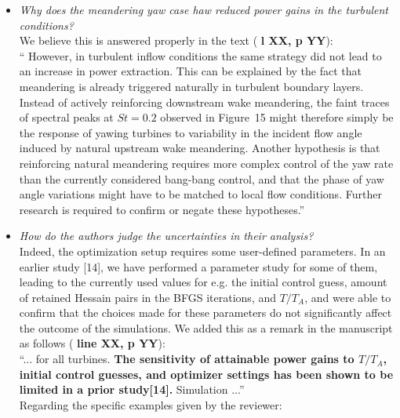\documentclass[]{article}
\newcommand{\red}[1]{\textbf{\color{red} #1}}
\newcommand{\revision}[1]{\textbf{#1}}
\begin{document}
\begin{itemize}
	\item \textit{Why does the meandering yaw case haw reduced power gains in the turbulent conditions?} \\ We believe this is answered properly in the text (\red{l XX, p YY}):\\ `` However, in turbulent inflow conditions the same strategy did not lead to an increase in power extraction. This can be explained by the fact that meandering is already triggered naturally in turbulent boundary layers. Instead of actively reinforcing downstream wake meandering, the faint traces of spectral peaks at $St = 0.2$ observed in Figure~15 might therefore simply be the response of yawing turbines to variability in the incident flow angle induced by natural upstream wake meandering. Another hypothesis is that reinforcing natural meandering requires more complex control of the yaw rate than the currently considered bang-bang control, and that the phase of yaw angle variations might have to be matched to local flow conditions. Further research is required to confirm or negate these hypotheses.''
	\item \textit{How do the authors judge the uncertainties in their analysis?} \\ Indeed, the optimization setup requires some user-defined parameters. In an earlier study [14], we have performed a parameter study for some of them, leading to the currently used values for e.g. the initial control guess, amount of retained Hessain pairs in the BFGS iterations, and $T/T_A$, and were able to confirm that the choices made for these parameters do not significantly affect the outcome of the simulations. We added this as a remark in the manuscript as follows (\red{line XX, p YY}):\\ ``... for all turbines. \revision{The sensitivity of attainable power gains to $T/T_A$, initial control guesses, and optimizer settings has been shown to be limited in a prior study[14].} Simulation ...''\\ Regarding the specific examples given by the reviewer:
	\begin{enumerate}

\end{enumerate}
\end{itemize}
\end{document}

